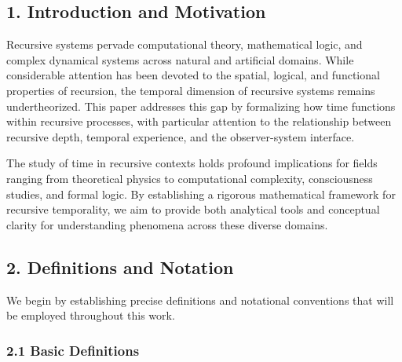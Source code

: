 \documentclass[
]{article}
\begin{document}
\subsection{1. Introduction and
Motivation}\label{introduction-and-motivation}

Recursive systems pervade computational theory, mathematical logic, and
complex dynamical systems across natural and artificial domains. While
considerable attention has been devoted to the spatial, logical, and
functional properties of recursion, the temporal dimension of recursive
systems remains undertheorized. This paper addresses this gap by
formalizing how time functions within recursive processes, with
particular attention to the relationship between recursive depth,
temporal experience, and the observer-system interface.

The study of time in recursive contexts holds profound implications for
fields ranging from theoretical physics to computational complexity,
consciousness studies, and formal logic. By establishing a rigorous
mathematical framework for recursive temporality, we aim to provide both
analytical tools and conceptual clarity for understanding phenomena
across these diverse domains.

\subsection{2. Definitions and Notation}\label{definitions-and-notation}

We begin by establishing precise definitions and notational conventions
that will be employed throughout this work.

\subsubsection{2.1 Basic Definitions}\label{basic-definitions}
\end{document}
